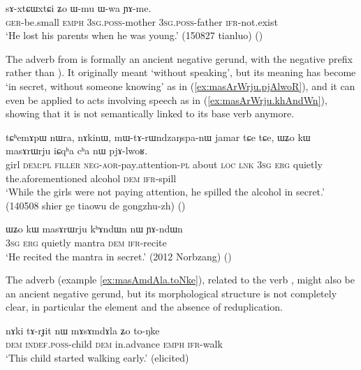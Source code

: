 \begin{exe}
\ex \label{ex:sAxtCWtCi.YAme}
\gll sɤ-xtɕɯ\redp{}xtɕi ʑo ɯ-mu ɯ-wa ɲɤ-me. \\
\textsc{ger}-be.small \textsc{emph} \textsc{3sg}.\textsc{poss}-mother  \textsc{3sg}.\textsc{poss}-father \textsc{ifr}-not.exist \\ 
\glt `He lost his parents when he was young.' (150827 tianluo) ()
\end{exe}

The adverb   from  is formally an ancient negative gerund, with the negative prefix  rather than ). It originally meant `without speaking', but its meaning has become `in secret, without someone knowing' as in (\ref{ex:masArWrju.pjAlwoR}), and it can even be applied to acts involving speech as in (\ref{ex:masArWrju.khAndWn}), showing that it is not semantically linked to its base verb anymore.

\begin{exe}
\ex \label{ex:masArWrju.pjAlwoR}
\gll  tɕʰemɤpɯ nɯra, nɤkinɯ, mɯ-tɤ-rɯndzaŋspa-nɯ jamar tɕe tɕe,
ɯʑo kɯ masɤrɯrju iɕqʰa cʰa nɯ pjɤ-lwoʁ. \\
girl \textsc{dem}:\textsc{pl} \textsc{filler} \textsc{neg}-\textsc{aor}-pay.attention-\textsc{pl} about \textsc{loc} \textsc{lnk} \textsc{3sg} \textsc{erg} quietly the.aforementioned alcohol \textsc{dem} \textsc{ifr}-spill \\
\glt `While the girls were not paying attention, he spilled the alcohol in secret.' (140508 shier ge tiaowu de gongzhu-zh)
()
\end{exe}

\begin{exe}
\ex \label{ex:masArWrju.khAndWn}
\gll ɯʑo kɯ masɤrɯrju kʰɤndɯn nɯ ɲɤ-ndɯn \\
\textsc{3sg} \textsc{erg} quietly mantra \textsc{dem} \textsc{ifr}-recite \\
\glt `He recited the mantra in secret.' (2012 Norbzang)
()
\end{exe}

The adverb  (example \ref{ex:masAmdAla.toNke}), related to the verb , might also be an ancient negative gerund, but its morphological structure is not completely clear, in particular the element  and the absence of reduplication. 

\begin{exe}
\ex \label{ex:masAmdAla.toNke}
\gll nɤki tɤ-rɟit nɯ mɤsɤmdɤla ʑo to-ŋke \\
\textsc{dem} \textsc{indef}.\textsc{poss}-child \textsc{dem} in.advance \textsc{emph} \textsc{ifr}-walk \\
\glt `This child started walking early.' (elicited)
\end{exe}

